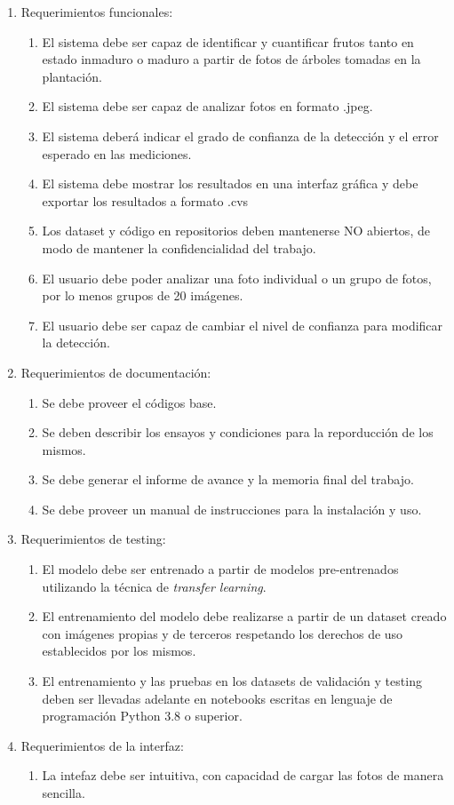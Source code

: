 \documentclass[
11pt %
]{charter}
\begin{document}
\begin{enumerate}
	\item Requerimientos funcionales:
	\begin{enumerate}
		\item El sistema debe ser capaz de identificar y cuantificar frutos tanto en estado inmaduro o maduro a partir de fotos de árboles tomadas en la plantación. 
		\item El sistema debe ser capaz de analizar fotos en formato .jpeg.
		\item El sistema deberá indicar el grado de confianza de la detección y el error esperado en las mediciones.
		\item El sistema debe mostrar los resultados en una interfaz gráfica y debe exportar los resultados a formato .cvs 
		\item Los dataset y código en repositorios deben mantenerse NO abiertos, de modo de mantener la confidencialidad del trabajo.
		\item El usuario debe poder analizar una foto individual o un grupo de fotos, por lo menos grupos de 20 imágenes.
		\item El usuario debe ser capaz de cambiar el nivel de confianza para modificar la detección.
	\end{enumerate}

	\item Requerimientos de documentación:
	\begin{enumerate}
		\item Se debe proveer el códigos base.
		\item Se deben describir los ensayos y condiciones para la reporducción de los mismos.
		\item Se debe generar el informe de avance y la memoria final del trabajo.
		\item Se debe proveer un manual de instrucciones para la instalación y uso.
	\end{enumerate}
	
	\item Requerimientos de testing:
	\begin{enumerate}
		\item El modelo debe ser entrenado a partir de modelos pre-entrenados utilizando la técnica de \textit{transfer learning}.
		\item El entrenamiento del modelo debe realizarse a partir de un dataset creado con imágenes propias y de terceros respetando los derechos de uso establecidos por los mismos.
		\item El entrenamiento y las pruebas en los datasets de validación y testing deben ser llevadas adelante en notebooks escritas en lenguaje de programación Python 3.8 o superior.
	\end{enumerate}
	
	\item Requerimientos de la interfaz:
	\begin{enumerate}
		\item La intefaz debe ser intuitiva, con capacidad de cargar las fotos de manera sencilla.
	\end{enumerate}

\end{enumerate}
\end{document}
